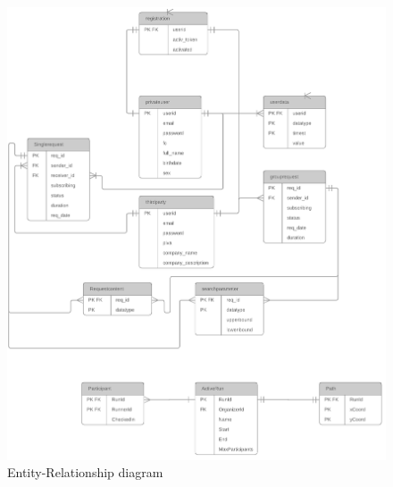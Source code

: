 \documentclass[titlepage]{article}
\begin{document}
	\begin{figure}[H]
		\center
		\includegraphics[width=15cm]{ERFinal.png}
		\caption{Entity-Relationship diagram}
		\label{fig:ER}
	\end{figure}
	
	\pagebreak
	
	
\end{document}
